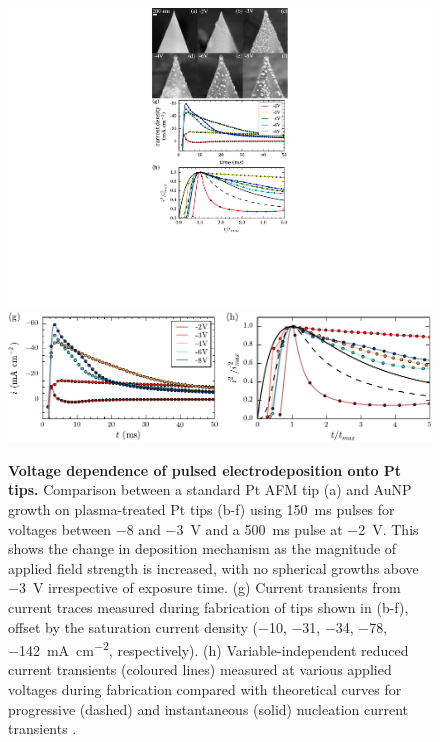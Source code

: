 \documentclass{article}
\begin{document}
\begin{figure}[bt]
\centering
\includegraphics{figures/tip_voltage_dependence}\\
\includegraphics{figures/current_transients}
\caption[Voltage dependence of pulsed electrodeposition onto Pt tips]{\textbf{Voltage dependence of pulsed electrodeposition onto Pt tips.} Comparison between a standard Pt AFM tip (a) and AuNP growth on plasma-treated Pt tips (b-f) using \SI{150}{ms} pulses for voltages between \num{-8} and \SI{-3}{V} and a \SI{500}{ms} pulse at \SI{-2}{V}. This shows the change in deposition mechanism as the magnitude of applied field strength is increased, with no spherical growths above \SI{-3}{V} irrespective of exposure time. (g) Current transients from current traces measured during fabrication of tips shown in (b-f), offset by the saturation current density (\num{-10}, \num{-31}, \num{-34}, \num{-78}, \SI{-142}{mA\per cm\squared}, respectively). (h) Variable-independent reduced current transients (coloured lines) measured at various applied voltages during fabrication compared with theoretical curves for progressive (dashed) and instantaneous (solid) nucleation current transients \cite{scharifker1983}.}
\label{fig:electrochemical_voltage_dependence}
\end{figure}
\end{document}
